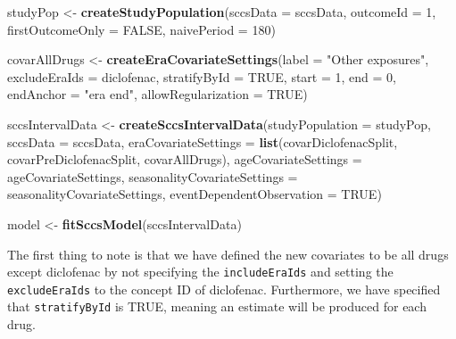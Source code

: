\documentclass[
]{article}
\newenvironment{Shaded}{\begin{snugshade}}{\end{snugshade}}
\newcommand{\DataTypeTok}[1]{\textcolor[rgb]{0.13,0.29,0.53}{#1}}
\newcommand{\DecValTok}[1]{\textcolor[rgb]{0.00,0.00,0.81}{#1}}
\newcommand{\KeywordTok}[1]{\textcolor[rgb]{0.13,0.29,0.53}{\textbf{#1}}}
\newcommand{\NormalTok}[1]{#1}
\newcommand{\OtherTok}[1]{\textcolor[rgb]{0.56,0.35,0.01}{#1}}
\newcommand{\StringTok}[1]{\textcolor[rgb]{0.31,0.60,0.02}{#1}}
\begin{document}
\begin{Shaded}
\begin{Highlighting}[]
\NormalTok{studyPop <-}\StringTok{ }\KeywordTok{createStudyPopulation}\NormalTok{(}\DataTypeTok{sccsData =}\NormalTok{ sccsData,}
                                  \DataTypeTok{outcomeId =} \DecValTok{1}\NormalTok{,}
                                  \DataTypeTok{firstOutcomeOnly =} \OtherTok{FALSE}\NormalTok{,}
                                  \DataTypeTok{naivePeriod =} \DecValTok{180}\NormalTok{)}

\NormalTok{covarAllDrugs <-}\StringTok{ }\KeywordTok{createEraCovariateSettings}\NormalTok{(}\DataTypeTok{label =} \StringTok{"Other exposures"}\NormalTok{,}
                                            \DataTypeTok{excludeEraIds =}\NormalTok{ diclofenac,}
                                            \DataTypeTok{stratifyById =} \OtherTok{TRUE}\NormalTok{,}
                                            \DataTypeTok{start =} \DecValTok{1}\NormalTok{,}
                                            \DataTypeTok{end =} \DecValTok{0}\NormalTok{,}
                                            \DataTypeTok{endAnchor =} \StringTok{"era end"}\NormalTok{,}
                                            \DataTypeTok{allowRegularization =} \OtherTok{TRUE}\NormalTok{)}

\NormalTok{sccsIntervalData <-}\StringTok{ }\KeywordTok{createSccsIntervalData}\NormalTok{(}\DataTypeTok{studyPopulation =}\NormalTok{ studyPop,}
                                           \DataTypeTok{sccsData =}\NormalTok{ sccsData,}
                                           \DataTypeTok{eraCovariateSettings =} \KeywordTok{list}\NormalTok{(covarDiclofenacSplit,}
\NormalTok{                                                                       covarPreDiclofenacSplit,}
\NormalTok{                                                                       covarAllDrugs),}
                                           \DataTypeTok{ageCovariateSettings =}\NormalTok{ ageCovariateSettings,}
                                           \DataTypeTok{seasonalityCovariateSettings =}\NormalTok{ seasonalityCovariateSettings,}
                                           \DataTypeTok{eventDependentObservation =} \OtherTok{TRUE}\NormalTok{)}

\NormalTok{model <-}\StringTok{ }\KeywordTok{fitSccsModel}\NormalTok{(sccsIntervalData)}
\end{Highlighting}
\end{Shaded}

The first thing to note is that we have defined the new covariates to be
all drugs except diclofenac by not specifying the \texttt{includeEraIds}
and setting the \texttt{excludeEraIds} to the concept ID of diclofenac.
Furthermore, we have specified that \texttt{stratifyById} is TRUE,
meaning an estimate will be produced for each drug.
\end{document}
